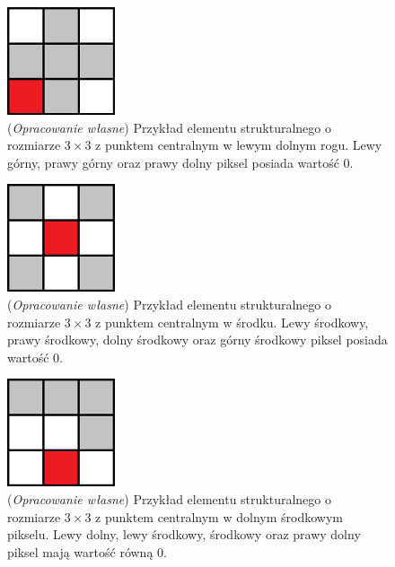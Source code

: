 \documentclass{article}
\begin{document}
        \begin{figure}[H]
            \captionsetup{margin=1.5cm}
            \centering
            \includegraphics[width=120px]{element_strukturalny_3.png}
            \caption
            {
                (\textit{Opracowanie własne}) Przykład elementu strukturalnego o rozmiarze \(3 \times 3\) z punktem centralnym w lewym dolnym rogu.
                Lewy górny, prawy górny oraz prawy dolny piksel posiada wartość 0.
            }
        \end{figure}
        \begin{figure}[H]
            \captionsetup{margin=1.5cm}
            \centering
            \includegraphics[width=120px]{element_strukturalny_4.png}
            \caption
            {
                (\textit{Opracowanie własne}) Przykład elementu strukturalnego o rozmiarze \(3 \times 3\) z punktem centralnym w środku.
                Lewy środkowy, prawy środkowy, dolny środkowy oraz górny środkowy piksel posiada wartość 0.
            }
        \end{figure}
        \begin{figure}[H]
            \captionsetup{margin=1.5cm}
            \centering
            \includegraphics[width=120px]{element_strukturalny_5.png}
            \caption
            {
                (\textit{Opracowanie własne}) Przykład elementu strukturalnego o rozmiarze \(3 \times 3\) z punktem centralnym w dolnym środkowym pikselu.
                Lewy dolny, lewy środkowy, środkowy oraz prawy dolny piksel mają wartość równą 0.
            }
        \end{figure}
\end{document}
